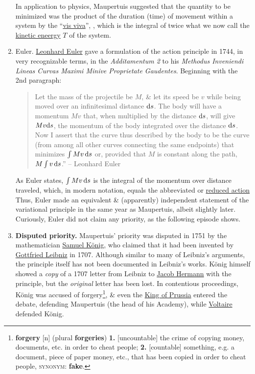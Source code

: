 \documentclass{article}
\begin{document}
\begin{enumerate}
	In application to physics, Maupertuis suggested that the quantity to be minimized was the product of the duration (time) of movement within a system by the ``\href{https://en.wikipedia.org/wiki/Vis_viva}{vis viva}'', , which is the integral of twice what we now call the \href{https://en.wikipedia.org/wiki/Kinetic_energy}{kinetic eneergy} $T$ of the system.
	\item {\sc Euler.} \href{https://en.wikipedia.org/wiki/Leonhard_Euler}{Leonhard Euler} gave a formulation of the action principle in 1744, in very recognizable terms, in the \textit{Additamentum 2} to his \textit{Methodus Inveniendi Lineas Curvas Maximi Minive Proprietate Gaudentes}. Beginning with the 2nd paragraph:
	\begin{quotation}
		Let the mass of the projectile be $M$, \& let its speed be $v$ while being moved over an infinitesimal distance ${\rm d}s$. The body will have a momentum $Mv$ that, when multiplied by the distance ${\rm d}s$, will give $Mv{\rm d}s$, the momentum of the body integrated over the distance ${\rm d}s$. Now I assert that the curve thus described by the body to be the curve (from among all other curves connecting the same endpoints) that minimizes $\int Mv\,{\rm d}s$ or, provided that $M$ is constant along the path, $M\int v\,{\rm d}s$.'' -- Leonhard Euler
	\end{quotation}
	As Euler states, $\int Mv\,{\rm d}s$ is the integral of the momentum over distance traveled, which, in modern notation, equals the abbreviated or \href{https://en.wikipedia.org/wiki/Reduced_action}{reduced action}  Thus, Euler made an equivalent \& (apparently) independent statement of the variational principle in the same year as Maupertuis, albeit slightly later. Curiously, Euler did not claim any priority, as the following episode shows.
	\item {\bf Disputed priority.} Maupertuis' priority was disputed in 1751 by the mathematician \href{https://en.wikipedia.org/wiki/Samuel_K%C3%B6nig}{Samuel K\"onig}, who claimed that it had been invented by \href{https://en.wikipedia.org/wiki/Gottfried_Leibniz}{Gottfried Leibniz} in 1707. Although similar to many of Leibniz's arguments, the principle itself has not been documented in Leibniz's works. K\"onig himself showed a \textit{copy} of a 1707 letter from Leibniz to \href{https://en.wikipedia.org/wiki/Jacob_Hermann_(mathematician)}{Jacob Hermann} with the principle, but the \textit{original} letter has been lost. In contentious proceedings, K\"onig was accused of forgery\footnote{\textbf{forgery} [n] (plural \textbf{forgeries}) \textbf{1.} [uncountable] the crime of copying money, documents, etc. in order to cheat people; \textbf{2.} [countable] something, e.g. a document, piece of paper money, etc., that has been copied in order to cheat people, \textsc{synonym}: \textbf{fake}.}, \& even the \href{https://en.wikipedia.org/wiki/Frederick_the_Great}{King of Prussia} entered the debate, defending Maupertuis (the head of his Academy), while \href{https://en.wikipedia.org/wiki/Voltaire}{Voltaire} defended K\"onig.
	

\end{enumerate}
\end{document}
